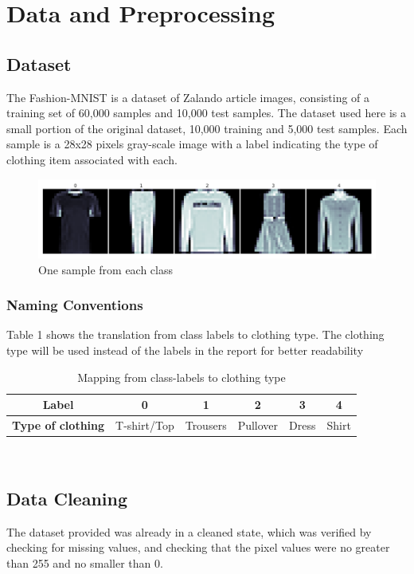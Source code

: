\section{Data and Preprocessing}
\subsection{Dataset}
The Fashion-MNIST is a dataset of Zalando article images, consisting of a training set of 60,000 samples and 10,000 test samples.
The dataset used here is a small portion of the original dataset, 10,000 training and 5,000 test samples.
Each sample is a 28x28 pixels gray-scale image with a label indicating the type of clothing item associated with each.
\newline

\begin{figure}[ht]
\centering
\includegraphics[scale=0.45]{figures_for_report/samples_from_classes}
\captionsetup{justification=centering,margin=2cm}
\caption{One sample from each class}
\end{figure}
\subsubsection{Naming Conventions}
Table 1 shows the translation from class labels to clothing type.
The clothing type will be used instead of the labels in the report for better readability \\
\begin{table}[!ht]
  \footnotesize
  \centering
\begin{tabular}{ c c c c c c }
 \toprule
 \textbf{Label} & 0 & 1 & 2 & 3 & 4 \\
 \midrule 
 \textbf{Type of clothing} & T-shirt/Top & Trousers & Pullover & Dress & Shirt \\
 \bottomrule
\end{tabular} \\[0.2cm]
\captionsetup{justification=centering,margin=2cm}
\caption{Mapping from class-labels to clothing type}
\label{features}
\end{table}


\subsection{Data Cleaning}
The dataset provided was already in a cleaned state, which was verified by checking for missing values,
and checking that the pixel values were no greater than 255 and no smaller than 0.

